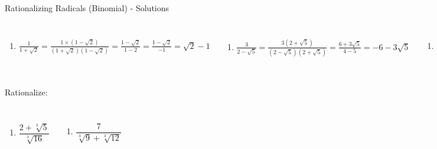 \documentclass[aspectratio=169]{beamer}
\begin{document}
\begin{frame}{Rationalizing Radicals (Binomial) - Solutions}
\begin{tcolorbox}[colback=lightgray,colframe=primary,title=Solutions]
\footnotesize
\begin{columns}[T]
\begin{enumerate}[label=4\textbf{a})]
  \item $\frac{1}{1+\sqrt{2}} = \frac{1\times(1-\sqrt{2})}{(1+\sqrt{2})(1-\sqrt{2})} = \frac{1-\sqrt{2}}{1-2} = \frac{1-\sqrt{2}}{-1} = \sqrt{2}-1$
\end{enumerate}
\begin{enumerate}[label=4\textbf{b})]
  \item $\frac{3}{2-\sqrt{5}} = \frac{3(2+\sqrt{5})}{(2-\sqrt{5})(2+\sqrt{5})} = \frac{6+3\sqrt{5}}{4-5} = -6-3\sqrt{5}$
\end{enumerate}
\begin{enumerate}[label=4\textbf{c})]
  \item $\frac{5}{\sqrt{3}-1} = \frac{5(\sqrt{3}+1)}{(\sqrt{3}-1)(\sqrt{3}+1)} = \frac{5\sqrt{3}+5}{3-1} = \frac{5\sqrt{3}+5}{2}$
\end{enumerate}
\begin{enumerate}[label=4\textbf{d})]
  \item $\frac{2}{1-\sqrt{7}} = \frac{2(1+\sqrt{7})}{(1-\sqrt{7})(1+\sqrt{7})} = \frac{2+2\sqrt{7}}{1-7} = -\frac{2+2\sqrt{7}}{6}$
\end{enumerate}
\begin{enumerate}[label=4\textbf{e})]
  \item $\frac{4}{2+\sqrt{y}} = \frac{4(2-\sqrt{y})}{(2+\sqrt{y})(2-\sqrt{y})} = \frac{8-4\sqrt{y}}{4-y}$
\end{enumerate}
\begin{enumerate}[label=4\textbf{f})]
  \item $\frac{6}{\sqrt{5}+\sqrt{2}} = \frac{6(\sqrt{5}-\sqrt{2})}{(\sqrt{5}+\sqrt{2})(\sqrt{5}-\sqrt{2})} = \frac{6\sqrt{5}-6\sqrt{2}}{5-2} = 2\sqrt{5}-2\sqrt{2}$
\end{enumerate}
\end{columns}
\end{tcolorbox}
\end{frame}

\begin{frame}{Rationalize:}
\begin{tcolorbox}[colback=lightgray,colframe=accent,title=Practice Problems]
\footnotesize
\begin{columns}[T]
\begin{enumerate}[label=5\textbf{a})]
  \item $\dfrac{2+\sqrt[3]{5}}{\sqrt[3]{16}}$
\end{enumerate}
\begin{enumerate}[label=5\textbf{b})]
  \item $\dfrac{7}{\sqrt[3]{9}+\sqrt[3]{12}}$
\end{enumerate}
\end{columns}
\end{tcolorbox}
\end{frame}
\end{document}
